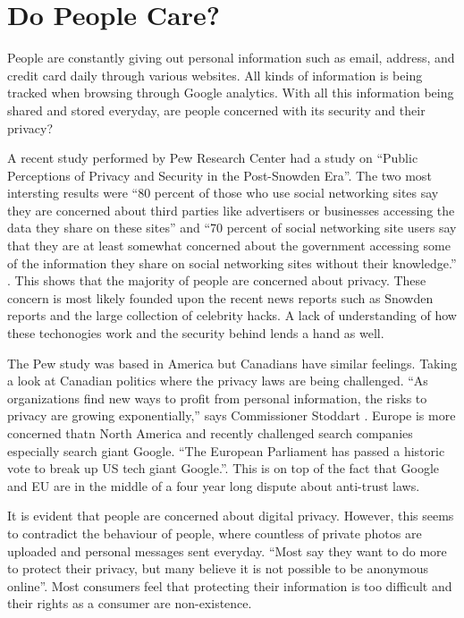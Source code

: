 \documentclass[12pt]{article}
\begin{document}
\section{Do People Care?}\label{sec:demand}

People are constantly giving out personal information such as email, address, and credit card daily through various websites. All kinds of information is being tracked when browsing through Google analytics. With all this information being shared and stored everyday, are people concerned with its security and their privacy?

A recent study performed by Pew Research Center had a study on ``Public Perceptions of Privacy and Security in the Post-Snowden Era''. The two most intersting results were ``80 percent of those who use social networking sites say they are concerned about third parties like advertisers or businesses accessing the data they share on these sites'' and ``70 percent of social networking site users say that they are at least somewhat concerned about the government accessing some of the information they share on social networking sites without their knowledge.'' \cite{Madden}. This shows that the majority of people are concerned about privacy. These concern is most likely founded upon the recent news reports such as Snowden reports and the large collection of celebrity hacks. A lack of understanding of how these techonogies work and the security behind lends a hand as well.

The Pew study was based in America but Canadians have similar feelings. Taking a look at Canadian politics where the privacy laws are being challenged. ``As organizations find new ways to profit from personal information, the risks to privacy are growing exponentially,'' says Commissioner Stoddart \cite{PrivacyCommissioner}. Europe is more concerned thatn North America and recently challenged search companies especially search giant Google. ``The European Parliament has passed a historic vote to break up US tech giant Google.''\cite{Cook}. This is on top of the fact that Google and EU are in the middle of a four year long dispute about anti-trust laws.

It is evident that people are concerned about digital privacy. However, this seems to contradict the behaviour of people, where countless of private photos are uploaded and personal messages sent everyday. ``Most say they want to do more to protect their privacy, but many believe it is not possible to be anonymous online''\cite{Madden}. Most consumers feel that protecting their information is too difficult and their rights as a consumer are non-existence. 
\end{document}
